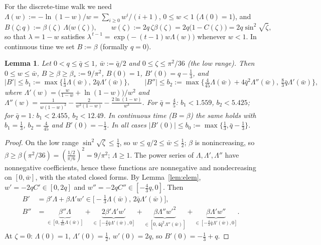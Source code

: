 \documentclass[11pt,a4paper]{article}
\newtheorem{lemma}[theorem]{Lemma}
\theoremstyle{definition}
\theoremstyle{remark}
\begin{document}
For the discrete-time walk we need $\Lambda(w):=-\ln(1-w)/w=\sum_{i\ge0}w^i/(i+1)$, $0\le w<1$ ($\Lambda(0)=1$), and
\begin{equation}\label{eq:B}
  B(\zeta;q):=\beta(\zeta)\,\Lambda\bigl(w(\zeta)\bigr),\qquad w(\zeta):=2q\,\zeta\beta(\zeta)=2q\bigl(1-C(\zeta)\bigr)
  =2q\sin^2\!\sqrt\zeta ,
\end{equation}
so that $\lambda=1-w$ satisfies $\lambda^{\,t-1}=\exp\bigl(-(t-1)w\Lambda(w)\bigr)$ whenever $w<1$. In continuous
time we set $B:=\beta$ (formally $q=0$).

\begin{lemma}\label{lem:B}
Let $0<q\le\bar q\le1$, $\bar w:=\bar q/2$ and $0\le\zeta\le\pi^2/36$ (the \emph{low range}). Then
$0\le w\le\bar w$, $B\ge\beta\ge\beta_*:=9/\pi^2$, $B(0)=1$, $B'(0)=q-\frac13$, and
\[
 |B'|\le b_1:=\max\bigl\{\tfrac13\Lambda(\bar w),\,2\bar q\Lambda'(\bar w)\bigr\},\qquad
 |B''|\le b_2:=\max\bigl\{\tfrac4{45}\Lambda(\bar w)+4\bar q^2\Lambda''(\bar w),\ \tfrac83\bar q\Lambda'(\bar w)\bigr\},
\]
where $\Lambda'(w)=\bigl(\frac w{1-w}+\ln(1-w)\bigr)/w^2$ and
$\Lambda''(w)=\frac1{w(1-w)^2}-\frac2{w^2(1-w)}-\frac{2\ln(1-w)}{w^3}$. For $\bar q=\frac45$: $b_1<1.559$, $b_2<5.425$; for $\bar q=1$: $b_1<2.455$, $b_2<12.49$.
In continuous time ($B=\beta$) the same holds with $b_1=\frac13$, $b_2=\frac4{45}$ and $B'(0)=-\frac13$. In all cases
$|B'(0)|\le b_0:=\max\{\frac13,\bar q-\frac13\}$.
\end{lemma}
\begin{proof}
On the low range $\sin^2\sqrt\zeta\le\frac14$, so $w\le q/2\le\bar w\le\frac12$; $\beta$ is nonincreasing, so
$\beta\ge\beta(\pi^2/36)=(\frac{1/2}{\pi/6})^2=9/\pi^2$; $\Lambda\ge1$. The power series of $\Lambda,\Lambda',\Lambda''$
have nonnegative coefficients, hence these functions are nonnegative and nondecreasing on $[0,\bar w]$, with the
stated closed forms. By Lemma~\ref{lem:elem}, $w'=-2qC'\in[0,2q]$ and $w''=-2qC''\in[-\frac43q,0]$. Then
\begin{align*}
  B'&=\beta'\Lambda+\beta\Lambda'w'\in\bigl[-\tfrac13\Lambda(\bar w),\,2\bar q\Lambda'(\bar w)\bigr],\\
  B''&=\underbrace{\beta''\Lambda}_{\in[0,\frac4{45}\Lambda(\bar w)]}+\underbrace{2\beta'\Lambda'w'}_{\in[-\frac43\bar q\Lambda'(\bar w),0]}
     +\underbrace{\beta\Lambda''w'^2}_{\in[0,4\bar q^2\Lambda''(\bar w)]}+\underbrace{\beta\Lambda'w''}_{\in[-\frac43\bar q\Lambda'(\bar w),0]} .
\end{align*}
At $\zeta=0$: $\Lambda(0)=1$, $\Lambda'(0)=\frac12$, $w'(0)=2q$, so $B'(0)=-\frac13+q$.
\end{proof}
\end{document}
